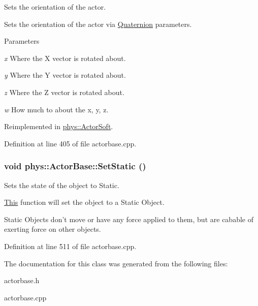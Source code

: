 Sets the orientation of the actor. 

Sets the orientation of the actor via \hyperlink{classphys_1_1Quaternion}{Quaternion} parameters. 
\begin{DoxyParams}{Parameters}
\item[{\em x}]Where the X vector is rotated about. \item[{\em y}]Where the Y vector is rotated about. \item[{\em z}]Where the Z vector is rotated about. \item[{\em w}]How much to about the x, y, z. \end{DoxyParams}


Reimplemented in \hyperlink{classphys_1_1ActorSoft_a84541e8ebf7b54c91d2353d5f84381bb}{phys::ActorSoft}.



Definition at line 405 of file actorbase.cpp.

\hypertarget{classphys_1_1ActorBase_af0219532fe71d1d84042a20a88fe5037}{
\subsubsection[{SetStatic}]{\setlength{\rightskip}{0pt plus 5cm}void phys::ActorBase::SetStatic ()}}
\label{d8/d0f/classphys_1_1ActorBase_af0219532fe71d1d84042a20a88fe5037}


Sets the state of the object to Static. 

\hyperlink{structThis}{This} function will set the object to a Static Object. \par
 Static Objects don't move or have any force applied to them, but are cabable of exerting force on other objects. 

Definition at line 511 of file actorbase.cpp.



The documentation for this class was generated from the following files:\begin{DoxyCompactItemize}
\item 
actorbase.h\item 
actorbase.cpp\end{DoxyCompactItemize}
